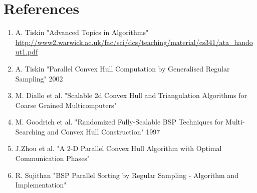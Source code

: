 \documentclass[a4paper]{article}
\begin{document}
    \begin{figure}
        \centering
    \end{figure}
\section {References}
    \begin {enumerate}
        \item A. Tiskin "Advanced Topics in Algorithms" \url{http://www2.warwick.ac.uk/fac/sci/dcs/teaching/material/cs341/ata_handout1.pdf}
        \item A. Tiskin "Parallel Convex Hull Computation by Generalised Regular Sampling" 2002
        \item M. Diallo et al. "Scalable 2d Convex Hull and Triangulation Algorithms for Coarse Grained Multicomputers"
        \item M. Goodrich et al. "Randomized Fully-Scalable BSP Techniques for Multi-Searching and Convex Hull Construction" 1997
        \item J.Zhou et al. "A 2-D Parallel Convex Hull Algorithm with Optimal Communication Phases"
        \item R. Sujithan "BSP Parallel Sorting by Regular Sampling - Algorithm and Implementation"
    \end {enumerate}
\end{document}
